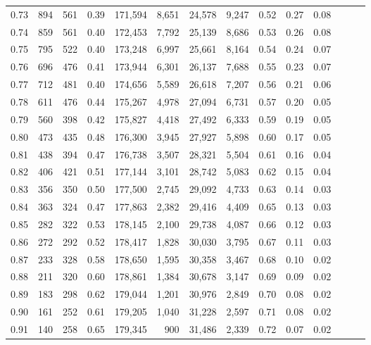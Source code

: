 \begin{tabular}{rrrrrrrrrrrrrr}
0.73 &    894 &  561 &  0.39 &  171,594 &    8,651 &  24,578 &   9,247 &  0.52 &  0.27 &      0.08 \\
0.74 &    859 &  561 &  0.40 &  172,453 &    7,792 &  25,139 &   8,686 &  0.53 &  0.26 &      0.08 \\
0.75 &    795 &  522 &  0.40 &  173,248 &    6,997 &  25,661 &   8,164 &  0.54 &  0.24 &      0.07 \\
0.76 &    696 &  476 &  0.41 &  173,944 &    6,301 &  26,137 &   7,688 &  0.55 &  0.23 &      0.07 \\
0.77 &    712 &  481 &  0.40 &  174,656 &    5,589 &  26,618 &   7,207 &  0.56 &  0.21 &      0.06 \\
0.78 &    611 &  476 &  0.44 &  175,267 &    4,978 &  27,094 &   6,731 &  0.57 &  0.20 &      0.05 \\
0.79 &    560 &  398 &  0.42 &  175,827 &    4,418 &  27,492 &   6,333 &  0.59 &  0.19 &      0.05 \\
0.80 &    473 &  435 &  0.48 &  176,300 &    3,945 &  27,927 &   5,898 &  0.60 &  0.17 &      0.05 \\
0.81 &    438 &  394 &  0.47 &  176,738 &    3,507 &  28,321 &   5,504 &  0.61 &  0.16 &      0.04 \\
0.82 &    406 &  421 &  0.51 &  177,144 &    3,101 &  28,742 &   5,083 &  0.62 &  0.15 &      0.04 \\
0.83 &    356 &  350 &  0.50 &  177,500 &    2,745 &  29,092 &   4,733 &  0.63 &  0.14 &      0.03 \\
0.84 &    363 &  324 &  0.47 &  177,863 &    2,382 &  29,416 &   4,409 &  0.65 &  0.13 &      0.03 \\
0.85 &    282 &  322 &  0.53 &  178,145 &    2,100 &  29,738 &   4,087 &  0.66 &  0.12 &      0.03 \\
0.86 &    272 &  292 &  0.52 &  178,417 &    1,828 &  30,030 &   3,795 &  0.67 &  0.11 &      0.03 \\
0.87 &    233 &  328 &  0.58 &  178,650 &    1,595 &  30,358 &   3,467 &  0.68 &  0.10 &      0.02 \\
0.88 &    211 &  320 &  0.60 &  178,861 &    1,384 &  30,678 &   3,147 &  0.69 &  0.09 &      0.02 \\
0.89 &    183 &  298 &  0.62 &  179,044 &    1,201 &  30,976 &   2,849 &  0.70 &  0.08 &      0.02 \\
0.90 &    161 &  252 &  0.61 &  179,205 &    1,040 &  31,228 &   2,597 &  0.71 &  0.08 &      0.02 \\
0.91 &    140 &  258 &  0.65 &  179,345 &      900 &  31,486 &   2,339 &  0.72 &  0.07 &      0.02 \\

\end{tabular}
